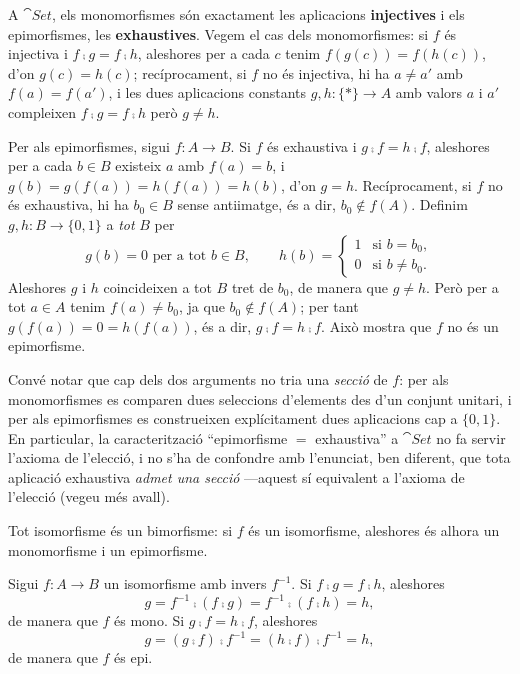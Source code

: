\begin{exemple}
A $\cat{Set}$, els monomorfismes són exactament les aplicacions \textbf{injectives} i els epimorfismes, les \textbf{exhaustives}. Vegem el cas dels monomorfismes: si $f$ és injectiva i $f\comp g=f\comp h$, aleshores per a cada $c$ tenim $f(g(c))=f(h(c))$, d'on $g(c)=h(c)$; recíprocament, si $f$ no és injectiva, hi ha $a\neq a'$ amb $f(a)=f(a')$, i les dues aplicacions constants $g,h\colon\{\ast\}\to A$ amb valors $a$ i $a'$ compleixen $f\comp g=f\comp h$ però $g\neq h$.

Per als epimorfismes, sigui $f\colon A\to B$. Si $f$ és exhaustiva i $g\comp f=h\comp f$, aleshores per a cada $b\in B$ existeix $a$ amb $f(a)=b$, i $g(b)=g(f(a))=h(f(a))=h(b)$, d'on $g=h$. Recíprocament, si $f$ no és exhaustiva, hi ha $b_0\in B$ sense antiimatge, és a dir, $b_0\notin f(A)$. Definim $g,h\colon B\to\{0,1\}$ a \emph{tot} $B$ per
\[
g(b)=0 \text{ per a tot } b\in B,
\qquad
h(b)=\begin{cases}1 & \text{si } b=b_0,\\ 0 & \text{si } b\neq b_0.\end{cases}
\]
Aleshores $g$ i $h$ coincideixen a tot $B$ tret de $b_0$, de manera que $g\neq h$. Però per a tot $a\in A$ tenim $f(a)\neq b_0$, ja que $b_0\notin f(A)$; per tant $g(f(a))=0=h(f(a))$, és a dir, $g\comp f=h\comp f$. Això mostra que $f$ no és un epimorfisme.

Convé notar que cap dels dos arguments no tria una \emph{secció} de $f$: per als monomorfismes es comparen dues seleccions d'elements des d'un conjunt unitari, i per als epimorfismes es construeixen explícitament dues aplicacions cap a $\{0,1\}$. En particular, la caracterització \enquote{epimorfisme $=$ exhaustiva} a $\cat{Set}$ no fa servir l'axioma de l'elecció, i no s'ha de confondre amb l'enunciat, ben diferent, que tota aplicació exhaustiva \emph{admet una secció} ---aquest sí equivalent a l'axioma de l'elecció (vegeu més avall).
\end{exemple}

\begin{proposicio}
Tot isomorfisme és un bimorfisme: si $f$ és un isomorfisme, aleshores és alhora un monomorfisme i un epimorfisme.
\end{proposicio}

\begin{prova}
Sigui $f\colon A\to B$ un isomorfisme amb invers $f^{-1}$. Si $f\comp g=f\comp h$, aleshores
\[
g=f^{-1}\comp(f\comp g)=f^{-1}\comp(f\comp h)=h,
\]
de manera que $f$ és mono. Si $g\comp f=h\comp f$, aleshores
\[
g=(g\comp f)\comp f^{-1}=(h\comp f)\comp f^{-1}=h,
\]
de manera que $f$ és epi.
\end{prova}

